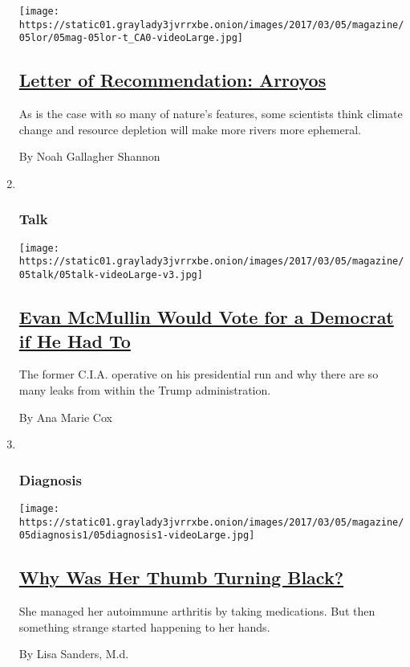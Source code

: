 \begin{enumerate}
  \texttt{[image: https://static01.graylady3jvrrxbe.onion/images/2017/03/05/magazine/05lor/05mag-05lor-t\_CA0-videoLarge.jpg]}

  \hypertarget{letter-of-recommendation-arroyos}{%
  \subsection{\texorpdfstring{\href{/2017/03/02/magazine/letter-of-recommendation-arroyos.html}{Letter
  of Recommendation:
  Arroyos}}{Letter of Recommendation: Arroyos}}\label{letter-of-recommendation-arroyos}}

  As is the case with so many of nature's features, some scientists
  think climate change and resource depletion will make more rivers more
  ephemeral.

  By Noah Gallagher Shannon
\item ~
  \hypertarget{talk}{%
  \subsubsection{Talk}\label{talk}}

  \texttt{[image: https://static01.graylady3jvrrxbe.onion/images/2017/03/05/magazine/05talk/05talk-videoLarge-v3.jpg]}

  \hypertarget{evan-mcmullin-would-vote-for-a-democrat-if-he-had-to}{%
  \subsection{\texorpdfstring{\href{/2017/03/01/magazine/evan-mcmullin-would-vote-for-a-democrat-if-he-had-to.html}{Evan
  McMullin Would Vote for a Democrat if He Had
  To}}{Evan McMullin Would Vote for a Democrat if He Had To}}\label{evan-mcmullin-would-vote-for-a-democrat-if-he-had-to}}

  The former C.I.A. operative on his presidential run and why there are
  so many leaks from within the Trump administration.

  By Ana Marie Cox
\item ~
  \hypertarget{diagnosis}{%
  \subsubsection{Diagnosis}\label{diagnosis}}

  \texttt{[image: https://static01.graylady3jvrrxbe.onion/images/2017/03/05/magazine/05diagnosis1/05diagnosis1-videoLarge.jpg]}

  \hypertarget{why-was-her-thumb-turning-black}{%
  \subsection{\texorpdfstring{\href{/2017/03/02/magazine/why-was-her-thumb-turning-black.html}{Why
  Was Her Thumb Turning
  Black?}}{Why Was Her Thumb Turning Black?}}\label{why-was-her-thumb-turning-black}}

  She managed her autoimmune arthritis by taking medications. But then
  something strange started happening to her hands.

  By Lisa Sanders, M.d.
\end{enumerate}

